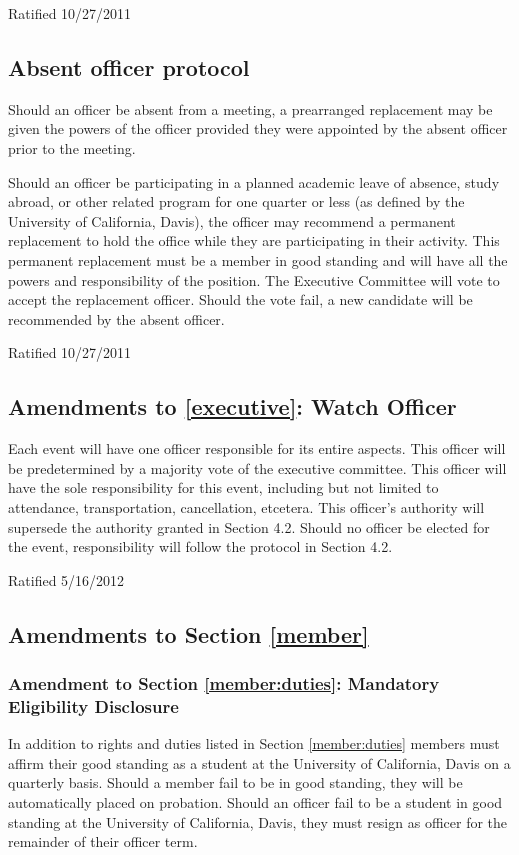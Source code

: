 \documentclass[12pt,titlepage,letter]{article}
\begin{document}
Ratified 10/27/2011  

\subsection{Absent officer protocol}
Should an officer be absent from a meeting, a prearranged replacement may be given the powers of the officer provided they were appointed by the absent officer prior to the meeting.
  
Should an officer be participating in a planned academic leave of absence, study abroad, or other related program for one quarter or less (as defined by the University of California, Davis), the officer may recommend a permanent replacement to hold the office while they are participating in their activity. This permanent replacement must be a member in good standing and will have all the powers and responsibility of the position. The Executive Committee will vote to accept the replacement officer. Should the vote fail, a new candidate will be recommended by the absent officer. 
  
Ratified 10/27/2011  

\subsection{Amendments to \ref{executive}: Watch Officer}

Each event will have one officer responsible for its entire aspects.  This officer will be predetermined by a majority vote of the executive committee. This officer will have the sole responsibility for this event, including but not limited to attendance, transportation, cancellation, etcetera. This officer’s authority will supersede the authority granted in Section 4.2. Should no officer be elected for the event, responsibility will follow the protocol in Section 4.2.

Ratified 5/16/2012

\subsection{Amendments to Section \ref{member}}

\subsubsection{Amendment to Section \ref{member:duties}: Mandatory Eligibility Disclosure}

In addition to rights and duties listed in Section \ref{member:duties} members must affirm their good standing as a student at the University of California, Davis on a quarterly basis. Should a member fail to be in good standing, they will be automatically placed on probation. Should an officer fail to be a student in good standing at the University of California, Davis, they must resign as officer for the remainder of their officer term.
\end{document}
